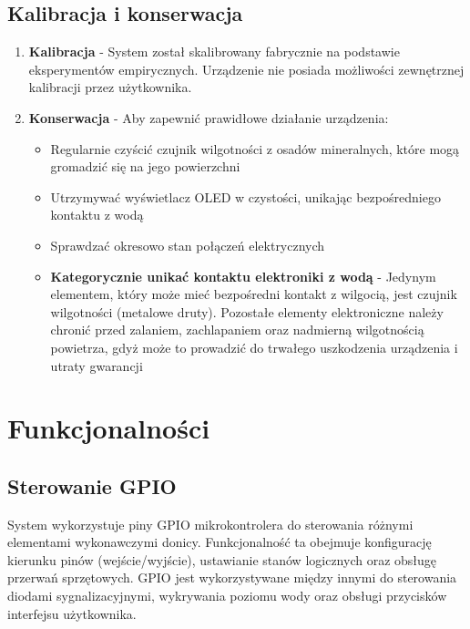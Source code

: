 \documentclass{article}
\begin{document}
\subsection{Kalibracja i konserwacja}
\begin{enumerate}
    \item \textbf{Kalibracja} - System został skalibrowany fabrycznie na podstawie eksperymentów empirycznych. Urządzenie nie posiada możliwości zewnętrznej kalibracji przez użytkownika.
    
    \item \textbf{Konserwacja} - Aby zapewnić prawidłowe działanie urządzenia:
    \begin{itemize}
        \item Regularnie czyścić czujnik wilgotności z osadów mineralnych, które mogą gromadzić się na jego powierzchni
        \item Utrzymywać wyświetlacz OLED w czystości, unikając bezpośredniego kontaktu z wodą
        \item Sprawdzać okresowo stan połączeń elektrycznych
        \item \textbf{Kategorycznie unikać kontaktu elektroniki z wodą} - Jedynym elementem, który może mieć bezpośredni kontakt z wilgocią, jest czujnik wilgotności (metalowe druty). Pozostałe elementy elektroniczne należy chronić przed zalaniem, zachlapaniem oraz nadmierną wilgotnością powietrza, gdyż może to prowadzić do trwałego uszkodzenia urządzenia i utraty gwarancji
    \end{itemize}
\end{enumerate}

\section{Funkcjonalności}



\subsection{Sterowanie GPIO}
System wykorzystuje piny GPIO mikrokontrolera do sterowania różnymi elementami wykonawczymi donicy. Funkcjonalność ta obejmuje konfigurację kierunku pinów (wejście/wyjście), ustawianie stanów logicznych oraz obsługę przerwań sprzętowych. GPIO jest wykorzystywane między innymi do sterowania diodami sygnalizacyjnymi, wykrywania poziomu wody oraz obsługi przycisków interfejsu użytkownika.


\end{document}
